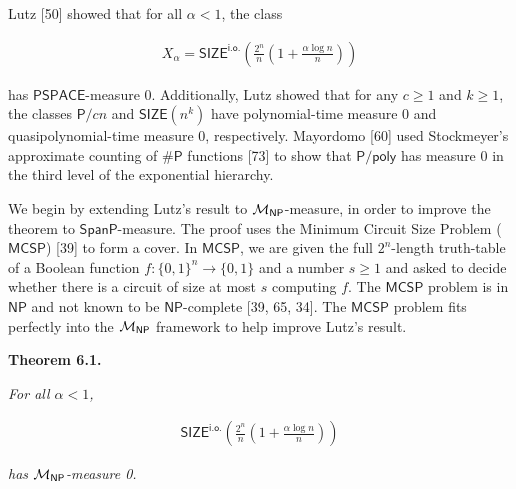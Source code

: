 \documentclass[10pt,a4paper]{article}
\begin{document}
Lutz [50] showed that for all $\alpha<1$, the class\par


\[\begin{gathered}
X_{\alpha}=\mathsf{SIZE}^{\mathsf{i.o.}}\!\!\left(\frac{2^{n}}{n}\left(1+\frac{\alpha\log n}{n}\right)\right)
\end{gathered}\]


has $\mathsf{PSPACE}$-measure 0. Additionally, Lutz showed that for any $c\geq 1$ and $k\geq 1$, the classes $\mathsf{P}/cn$ and $\mathsf{SIZE}\!(n^{k})$ have polynomial-time measure 0 and quasipolynomial-time measure 0, respectively.
Mayordomo [60] used Stockmeyer’s approximate counting
of ${\mathsf{\#}\mathsf{P}}$ functions [73] to show that $\mathsf{P}/\mathsf{poly}$ has
measure 0 in the third level of the exponential hierarchy.\par




We begin by extending Lutz’s result to ${{\cal M}_{\mathsf{NP}}}$-measure, in order to improve the theorem to $\mathsf{SpanP}$-measure. The proof uses the Minimum Circuit Size Problem ($\mathsf{MCSP}$) [39] to form a cover. In $\mathsf{MCSP}$, we are given the full $2^{n}$-length truth-table of a Boolean function $f:\{0,1\}^{n}\to\{0,1\}$ and a number $s\geq 1$ and asked to decide whether there is a circuit of size at most $s$ computing $f$. The $\mathsf{MCSP}$ problem is in $\mathsf{NP}$ and not known to be $\mathsf{NP}$-complete [39, 65, 34].
The $\mathsf{MCSP}$ problem fits perfectly into the ${{\cal M}_{\mathsf{NP}}}$ framework to help improve Lutz’s result.\par





\par\medskip\noindent\textbf{
\textbf{Theorem 6.1}\textbf{.}
}\par



\emph{For all $\alpha<1$,}\par


\[\begin{gathered}
\mathsf{SIZE}^{\mathsf{i.o.}}\!\!\left(\frac{2^{n}}{n}\left(1+\frac{\alpha\log
n}{n}\right)\right)
\end{gathered}\]


\emph{has ${{\cal M}_{\mathsf{NP}}}$-measure 0.}\par
\end{document}

